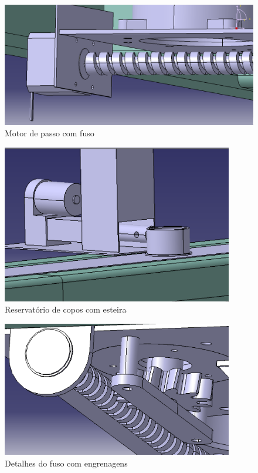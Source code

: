 \begin{apendicesenv}
\begin{figure}[H]
    \centering
    \includegraphics[width=1\textwidth]{figuras/estrutura/Motor de Passo no Fuso.png}
    \caption{Motor de passo com fuso}
    \label{fig:motordepassonofuso}
\end{figure}

\begin{figure}[H]
    \centering
    \includegraphics[width=0.9\textwidth]{figuras/estrutura/Recipiente dos Copos + Esteira.png}
    \caption{Reservatório de copos com esteira}
    \label{fig:reservatorioCopos}
\end{figure}

\begin{figure}[H]
    \centering
    \includegraphics[width=0.9\textwidth]{figuras/estrutura/Detalhe Fuso com Engrenagem.png}
    \caption{Detalhes do fuso com engrenagens}
    \label{fig:fusoEngrenagens}
\end{figure}   


\end{apendicesenv}
